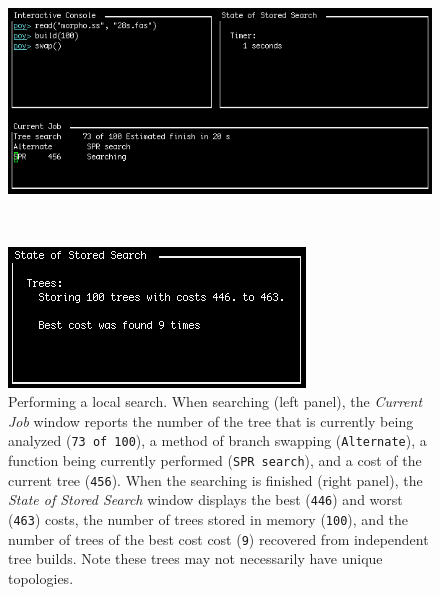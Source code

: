 {\begin{figure}
\centering
\begin{minipage}[c]{0.49\textwidth}
   		\includegraphics[width=\textwidth]{doc/figures/swap1.jpg}
\end{minipage}
\,
\begin{minipage}[c]{0.453\textwidth}
	   	\includegraphics[width=\textwidth]{doc/figures/swap2.jpg}
   	\end{minipage}
\caption{Performing a local search. When searching (left panel), the \emph{Current Job} window reports the number of the tree that is currently being analyzed (\texttt{73 of 100}), a method of branch swapping (\texttt{Alternate}), a function being currently performed (\texttt{SPR search}), and a cost of the current tree (\texttt{456}). When the searching is finished (right panel), the \emph{State of Stored Search} window displays the best (\texttt{446}) and worst (\texttt{463}) costs, the number of trees stored in memory (\texttt{100}), and the number of trees of the best cost cost (\texttt{9}) recovered from independent tree builds. Note these trees may not necessarily have unique topologies.} 
\label{fig:swapping}
\end{figure}

}
